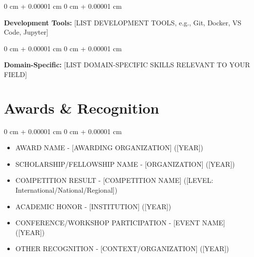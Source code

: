 \documentclass[10pt, a4paper]{article}
\newenvironment{highlights}{
    \begin{itemize}[
        topsep=0.15 cm,
        parsep=0.08 cm,
        partopsep=0pt,
        itemsep=0.05 cm,
        leftmargin=0 cm + 10pt
    ]
}{
    \end{itemize}
} %
\newenvironment{onecolentry}{
    \begin{adjustwidth}{
        0 cm + 0.00001 cm
    }{
        0 cm + 0.00001 cm
    }
}{
    \end{adjustwidth}
} %
\begin{document}
        \vspace{0.2 cm}

        \begin{onecolentry}
            \textbf{Development Tools:} [LIST DEVELOPMENT TOOLS, e.g., Git, Docker, VS Code, Jupyter]
        \end{onecolentry}

        \vspace{0.2 cm}

        \begin{onecolentry}
            \textbf{Domain-Specific:} [LIST DOMAIN-SPECIFIC SKILLS RELEVANT TO YOUR FIELD]
        \end{onecolentry}

    \section{Awards \& Recognition}

        \begin{onecolentry}
            \begin{highlights}
                \item [AWARD NAME] - [AWARDING ORGANIZATION] ([YEAR])
                \item [SCHOLARSHIP/FELLOWSHIP NAME] - [ORGANIZATION] ([YEAR])
                \item [COMPETITION RESULT] - [COMPETITION NAME] ([LEVEL: International/National/Regional])
                \item [ACADEMIC HONOR] - [INSTITUTION] ([YEAR])
                \item [CONFERENCE/WORKSHOP PARTICIPATION] - [EVENT NAME] ([YEAR])
                \item [OTHER RECOGNITION] - [CONTEXT/ORGANIZATION] ([YEAR])
            \end{highlights}
        \end{onecolentry}

    
\end{document}
